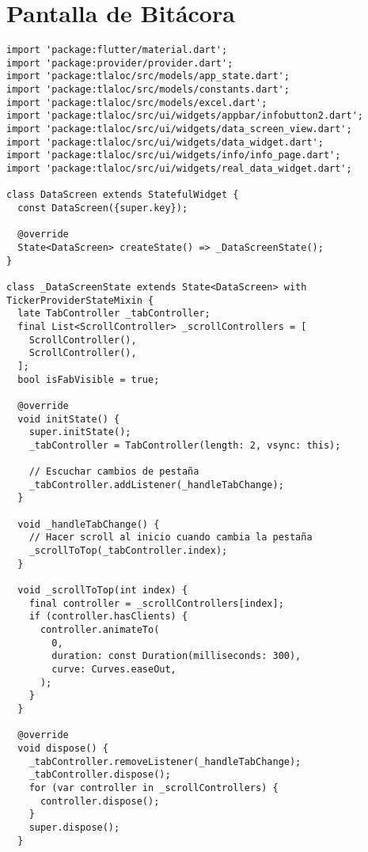 \section{Pantalla de Bitácora}
\label{anexo:alg14}
\begin{verbatim}
import 'package:flutter/material.dart';
import 'package:provider/provider.dart';
import 'package:tlaloc/src/models/app_state.dart';
import 'package:tlaloc/src/models/constants.dart';
import 'package:tlaloc/src/models/excel.dart';
import 'package:tlaloc/src/ui/widgets/appbar/infobutton2.dart';
import 'package:tlaloc/src/ui/widgets/data_screen_view.dart';
import 'package:tlaloc/src/ui/widgets/data_widget.dart';
import 'package:tlaloc/src/ui/widgets/info/info_page.dart';
import 'package:tlaloc/src/ui/widgets/real_data_widget.dart';

class DataScreen extends StatefulWidget {
  const DataScreen({super.key});

  @override
  State<DataScreen> createState() => _DataScreenState();
}

class _DataScreenState extends State<DataScreen> with TickerProviderStateMixin {
  late TabController _tabController;
  final List<ScrollController> _scrollControllers = [
    ScrollController(),
    ScrollController(),
  ];
  bool isFabVisible = true;

  @override
  void initState() {
    super.initState();
    _tabController = TabController(length: 2, vsync: this);

    // Escuchar cambios de pestaña
    _tabController.addListener(_handleTabChange);
  }

  void _handleTabChange() {
    // Hacer scroll al inicio cuando cambia la pestaña
    _scrollToTop(_tabController.index);
  }

  void _scrollToTop(int index) {
    final controller = _scrollControllers[index];
    if (controller.hasClients) {
      controller.animateTo(
        0,
        duration: const Duration(milliseconds: 300),
        curve: Curves.easeOut,
      );
    }
  }

  @override
  void dispose() {
    _tabController.removeListener(_handleTabChange);
    _tabController.dispose();
    for (var controller in _scrollControllers) {
      controller.dispose();
    }
    super.dispose();
  }


\end{verbatim}
